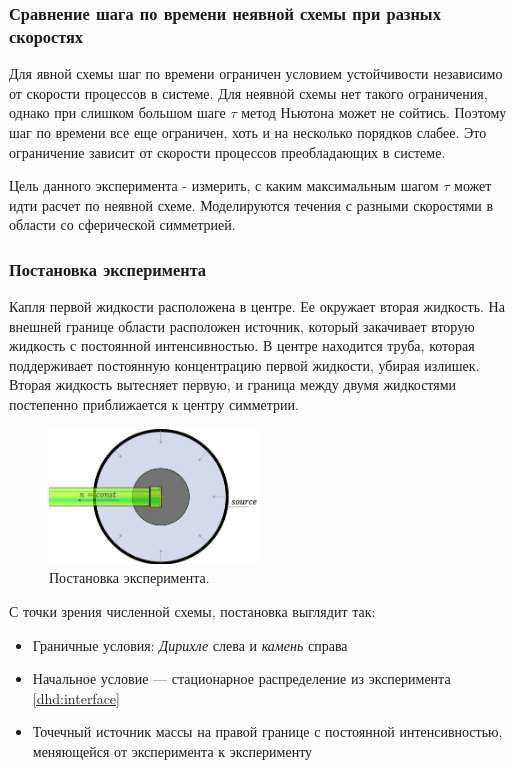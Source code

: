 \subsubsection{Сравнение шага по времени неявной схемы при разных скоростях \label{dhd:t_tau}}
Для явной схемы шаг по времени ограничен условием устойчивости независимо от скорости процессов в системе. Для неявной схемы нет такого ограничения, однако при слишком большом шаге $\tau$ метод Ньютона может не сойтись. Поэтому шаг по времени все еще ограничен, хоть и на несколько порядков слабее. Это ограничение зависит от скорости процессов преобладающих в системе.
\par
Цель данного эксперимента - измерить, с каким максимальным шагом $\tau$ может идти расчет по неявной схеме. Моделируются течения с разными скоростями в области со сферической симметрией.

\subsubsection*{Постановка эксперимента} 
Капля первой жидкости расположена в центре. Ее окружает вторая жидкость. На внешней границе области расположен источник, который закачивает вторую жидкость с постоянной интенсивностью. В центре находится труба, которая поддерживает постоянную концентрацию первой жидкости, убирая излишек. Вторая жидкость вытесняет первую, и граница между двумя жидкостями постепенно приближается к центру симметрии.
\begin{figure}[H]
\centering
\includegraphics[width=0.5\textwidth]{dhd_t_tau/tube_experiment.png}
\caption{Постановка эксперимента.}
\end{figure}
С точки зрения численной схемы, постановка выглядит так:
\begin{itemize}
\item Граничные условия: \textit{Дирихле} слева и \textit{камень} справа
\item Начальное условие --- стационарное распределение из эксперимента \ref{dhd:interface}
\item Точечный источник массы на правой границе с постоянной интенсивностью, меняющейся от эксперимента к эксперименту
\end{itemize}

